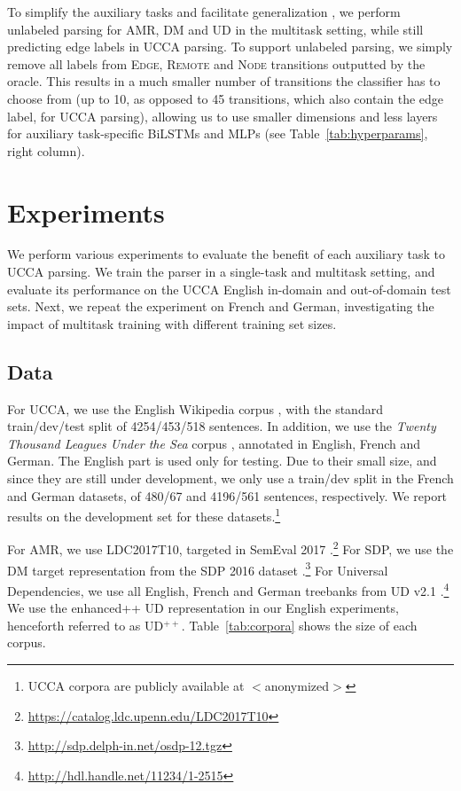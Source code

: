 \documentclass[11pt,a4paper]{article}
\begin{document}
To simplify the auxiliary tasks and facilitate generalization \cite{E17-2026},
we perform unlabeled parsing for AMR, DM and UD in the multitask setting,
while still predicting edge labels in UCCA parsing.
To support unlabeled parsing, we simply remove all labels from
\textsc{Edge}, \textsc{Remote} and \textsc{Node} transitions outputted by the oracle.
This results in a much smaller number of transitions the classifier has to choose from
(up to 10, as opposed to 45 transitions, which also contain the edge label, for UCCA parsing),
allowing us to use smaller dimensions and less layers for auxiliary task-specific BiLSTMs and MLPs
(see Table~\ref{tab:hyperparams}, right column).



\section{Experiments}\label{sec:experiments}

We perform various experiments to evaluate the benefit of each auxiliary task to UCCA parsing.
We train the parser in a single-task and multitask setting,
and evaluate its performance on the UCCA English in-domain and out-of-domain test sets.
Next, we repeat the experiment on French and German, investigating the impact of multitask
training with different training set sizes.

\subsection{Data}\label{sec:data}

For UCCA, we use the English Wikipedia corpus \cite{abend2013universal},
with the standard train/dev/test split of 4254/453/518 sentences.
In addition, we use
the \textit{Twenty Thousand Leagues Under the Sea} corpus \cite[20K leagues;][]{sulem2015conceptual},
annotated in English, French and German.
The English part is used only for testing.
Due to their small size, and since they are still under development, we only use a train/dev split
in the French and German datasets, of 480/67 and 4196/561 sentences, respectively.
We report results on the development set for these datasets.\footnote{UCCA corpora are publicly
available at $<$anonymized$>$}

For AMR, we use LDC2017T10, targeted in SemEval 2017
\cite{may2017semeval}.\footnote{\url{https://catalog.ldc.upenn.edu/LDC2017T10}}
For SDP, we use the DM target representation from the SDP 2016 dataset
\cite{oepen2016towards}.\footnote{\url{http://sdp.delph-in.net/osdp-12.tgz}}
For Universal Dependencies, we use all English, French and German treebanks from UD v2.1
\cite{11234/1-2515}.\footnote{\url{http://hdl.handle.net/11234/1-2515}}
We use the enhanced++ UD representation \cite{SCHUSTER16.779} in our English experiments,
henceforth referred to as UD$^{++}$.
Table~\ref{tab:corpora} shows the size of each corpus.
\end{document}
